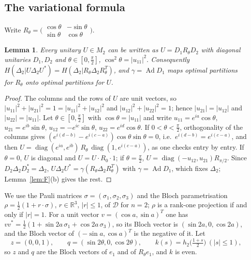 \documentclass[11pt]{article}
\DeclareMathOperator{\Ad}{Ad}
\DeclareMathOperator{\diag}{diag}
\newcommand{\R}{\mathbb{R}}
\newcommand{\D}{\mathcal{D}}
\theoremstyle{plain}
\newtheorem{lemma}[theorem]{Lemma}
\theoremstyle{definition}
\theoremstyle{remark}
\begin{document}
\subsection{The variational formula}

Write $R_\theta=\bigl(\begin{smallmatrix}\cos\theta&-\sin\theta\\ \sin\theta&\cos\theta\end{smallmatrix}\bigr)$.

\begin{lemma}\label{lem:normal}
Every unitary $U\in M_2$ can be written as $U=D_1R_\theta D_2$ with diagonal unitaries $D_1,D_2$ and $\theta\in[0,\frac\pi2]$,
$\cos^2\theta=|u_{11}|^2$. Consequently $H(\Delta_2|U\Delta_2U^*)=H(\Delta_2|R_\theta\Delta_2R_\theta^T)$, and $\gamma=\Ad D_1$ maps
optimal partitions for $R_\theta$ onto optimal partitions for $U$.
\end{lemma}
\begin{proof}
The columns and the rows of $U$ are unit vectors, so $|u_{11}|^2+|u_{21}|^2=1=|u_{11}|^2+|u_{12}|^2$ and
$|u_{12}|^2+|u_{22}|^2=1$; hence $|u_{21}|=|u_{12}|$ and $|u_{22}|=|u_{11}|$. Let $\theta\in[0,\frac\pi2]$ with $\cos\theta=|u_{11}|$
and write $u_{11}=e^{ia}\cos\theta$, $u_{21}=e^{ib}\sin\theta$, $u_{12}=-e^{ic}\sin\theta$, $u_{22}=e^{id}\cos\theta$. If
$0<\theta<\frac\pi2$, orthogonality of the columns gives $(e^{i(d-b)}-e^{i(c-a)})\cos\theta\sin\theta=0$, i.e.\
$e^{i(d-b)}=e^{i(c-a)}$, and then $U=\diag(e^{ia},e^{ib})\,R_\theta\,\diag(1,e^{i(c-a)})$, as one checks entry by
entry. If $\theta=0$, $U$ is diagonal and $U=U\cdot R_0\cdot1$; if $\theta=\frac\pi2$, $U=\diag(-u_{12},u_{21})R_{\pi/2}$.
Since $D_2\Delta_2D_2^*=\Delta_2$, $U\Delta_2U^*=\gamma(R_\theta\Delta_2R_\theta^T)$ with $\gamma=\Ad D_1$, which fixes
$\Delta_2$; Lemma~\ref{lem:F}(b) gives the rest.
\end{proof}

We use the Pauli matrices $\sigma=(\sigma_1,\sigma_2,\sigma_3)$ and the Bloch parametrisation
$\rho=\frac12(1+r\cdot\sigma)$, $r\in\R^3$, $|r|\le1$, of $\D$ for $n=2$; $\rho$ is a rank-one projection if and only if $|r|=1$. For a
unit vector $v=(\cos a,\sin a)^T$ one has $vv^*=\frac12(1+\sin2a\,\sigma_1+\cos2a\,\sigma_3)$, so its Bloch vector is
$(\sin2a,0,\cos2a)$, and the Bloch vector of $(-\sin a,\cos a)^T$ is the negative of it. Let
\[
  z=(0,0,1),\qquad q=(\sin2\theta,0,\cos2\theta),\qquad k(s)=h_2\bigl(\tfrac{1+s}2\bigr)\ (|s|\le1),
\]
so $z$ and $q$ are the Bloch vectors of $e_1$ and of $R_\theta e_1$, and $k$ is even.
\end{document}
